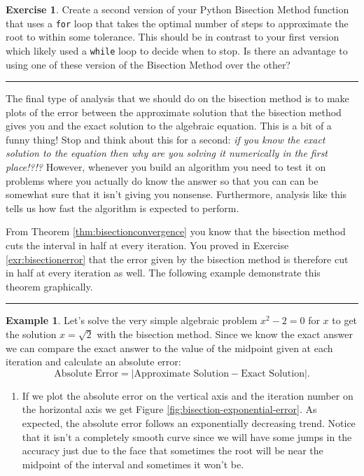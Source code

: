 \documentclass[
]{book}
\providecommand{\tightlist}{%
  \setlength{\itemsep}{0pt}\setlength{\parskip}{0pt}}
\theoremstyle{definition}
\theoremstyle{definition}
\newtheorem{example}{Example}[chapter]
\theoremstyle{definition}
\newtheorem{exercise}{Exercise}[chapter]
\theoremstyle{remark}
\begin{document}
\begin{exercise}
\protect\hypertarget{exr:unnamed-chunk-88}{}{\label{exr:unnamed-chunk-88} }Create a second version of your Python Bisection Method function that uses a \texttt{for}
loop that takes the optimal number of steps to approximate the root to
within some tolerance. This should be in contrast to your first version
which likely used a \texttt{while} loop to decide when to stop. Is there an advantage
to using one of these version of the Bisection Method over the other?
\end{exercise}

\begin{center}\rule{0.5\linewidth}{0.5pt}\end{center}

The final type of analysis that we should do on the bisection method is to make plots of the error between the approximate solution that the bisection method gives you and the exact solution to the algebraic equation. This is a bit of a funny thing! Stop and think about this for a second: \emph{if you know the exact solution to the equation then why are you solving it numerically in the first place!?!?} However, whenever you build an algorithm you need to test it on problems where you actually do know the answer so that you can can be somewhat sure that it isn't giving you nonsense. Furthermore, analysis like this tells us how fast the algorithm is expected to perform.

From Theorem \ref{thm:bisectionconvergence} you know that the bisection method cuts the interval in half at every iteration. You proved in Exercise \ref{exr:bisectionerror} that the error given by the bisection method is therefore cut in half at every iteration as well. The following example demonstrate this theorem graphically.

\begin{center}\rule{0.5\linewidth}{0.5pt}\end{center}

\begin{example}
\protect\hypertarget{exm:bisectionplots}{}{\label{exm:bisectionplots} }Let's solve the very simple algebraic problem \(x^2 - 2 = 0\) for \(x\) to get the solution \(x = \sqrt{2}\) with the bisection method. Since we know the exact answer we can compare the exact answer to the value of the midpoint given at each iteration and calculate an absolute error:
\[ \text{Absolute Error} = | \text{Approximate Solution} - \text{Exact Solution}|. \]

\begin{enumerate}
\def\labelenumi{\alph{enumi}.}
\tightlist
\item
  If we plot the absolute error on the vertical axis and the iteration number on the horizontal axis we get Figure \ref{fig:bisection-exponential-error}. As expected, the absolute error follows an exponentially decreasing trend. Notice that it isn't a completely smooth curve since we will have some jumps in the accuracy just due to the face that sometimes the root will be near the midpoint of the interval and sometimes it won't be.
\end{enumerate}
\end{example}
\end{document}
